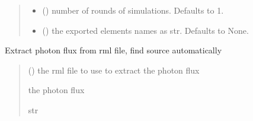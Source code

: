 \documentclass[letterpaper,10pt,english]{sphinxmanual}
\begin{document}
\begin{fulllineitems}
\begin{fulllineitems}
\begin{quote}
\begin{description}
\begin{itemize}
\item {} 
\sphinxAtStartPar
{} (\sphinxstyleliteralemphasis{\sphinxupquote{, }}) \textendash{} number of rounds of simulations. Defaults to 1.

\item {} 
\sphinxAtStartPar
{} (\sphinxstyleliteralemphasis{\sphinxupquote{, }}) \textendash{} the exported elements names as str. Defaults to None.

\end{itemize}

\end{description}\end{quote}

\end{fulllineitems}


\begin{fulllineitems}
\label{\detokenize{code_documentation:raypyng.postprocessing.PostProcess.extract_nrays_from_source}}
\pysigstartsignatures
{}
\pysigstopsignatures
\sphinxAtStartPar
Extract photon flux from rml file, find source automatically
\begin{quote}\begin{description}
\sphinxAtStartPar
{} () \textendash{} the rml file to use to extract the photon flux

\sphinxAtStartPar
the photon flux

\sphinxAtStartPar
str

\end{description}\end{quote}

\end{fulllineitems}



\end{fulllineitems}
\end{document}
